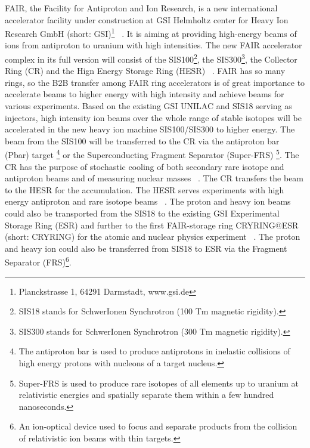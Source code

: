 \gls{FAIR}, the Facility for Antiproton and Ion Research, is a new international accelerator facility under construction at \gls{GSI} Helmholtz center for Heavy Ion Research GmbH (short: GSI)\footnote{Planckstrasse 1, 64291 Darmstadt, www.gsi.de} ~\cite{eschke_international_2005, noauthor_fair_2011}. It is aiming at providing high-energy beams of ions from antiproton to uranium with high intensities. The new FAIR accelerator complex in its full version will consist of the \gls{SIS100}\footnote{SIS18 stands for SchwerIonen Synchrotron (100 Tm magnetic rigidity).}, the SIS300\footnote{SIS300 stands for SchwerIonen Synchrotron (300 Tm magnetic rigidity).}, the Collector Ring (\gls{CR}) and the Hign Energy Storage Ring (\gls{HESR}) ~\cite{spiller_fair_2006, steck_advanced_2009}. FAIR has so many rings, so the B2B transfer among FAIR ring accelerators is of great importance to accelerate beams to higher energy with high intensity and achieve beams for various experiments. Based on the existing GSI \gls{UNILAC} and \gls{SIS18} serving as injectors, high intensity ion beams over the whole range of stable isotopes will be accelerated in the new heavy ion machine SIS100/\gls{SIS300} to higher energy. The beam from the SIS100 will be transferred to the CR via the antiproton bar (\gls{Pbar}) target \footnote{The antiproton bar is used to produce antiprotons in inelastic collisions of high energy protons with nucleons of a target nucleus.} or the Superconducting Fragment Separator (Super-FRS) \footnote{Super-FRS is used to produce rare isotopes of all elements up to uranium at relativistic energies and spatially separate them within a few hundred nanoseconds.}. The CR has the purpose of stochastic cooling of both secondary rare isotope and antiproton beams and of measuring nuclear masses ~\cite{nolden_collector_2006, bar_technical_2013}. The CR transfers the beam to the HESR for the accumulation. The HESR serves experiments with high energy antiproton and rare isotope beams ~\cite{toelle_hesr_2007}. The proton and heavy ion beams could also be transported from the SIS18 to the existing GSI Experimental Storage Ring (\gls{ESR}) and further to the first FAIR-storage ring CRYRING@ESR (short: CRYRING) for the atomic and nuclear physics experiment ~\cite{lestinsky_cryring_2015, lestinsky_cryring_2012}. The proton and heavy ion could also be transferred from SIS18 to ESR via the Fragment Separator (\gls{FRS})\footnote{An ion-optical device used to focus and separate products from the collision of relativistic ion beams with thin targets.}.

